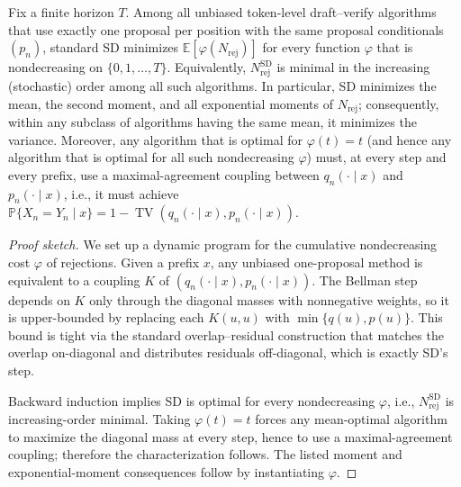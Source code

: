 \begin{theorem}\label{thm:sd-stepwise-coupling}\sloppy
Fix a finite horizon $T$. Among all unbiased token-level draft--verify algorithms that use exactly one proposal per position with the same proposal conditionals $(p_n)$, standard SD minimizes $\mathbb E[\varphi(N_{\mathrm{rej}})]$ for every function $\varphi$ that is nondecreasing on $\{0,1,\dots,T\}$. Equivalently, $N_{\mathrm{rej}}^{\mathrm{SD}}$ is minimal in the increasing (stochastic) order among all such algorithms. In particular, SD minimizes the mean, the second moment, and all exponential moments of $N_{\mathrm{rej}}$; consequently, within any subclass of algorithms having the same mean, it minimizes the variance. Moreover, any algorithm that is optimal for $\varphi(t)=t$ (and hence any algorithm that is optimal for all such nondecreasing $\varphi$) must, at every step and every prefix, use a maximal-agreement coupling between $q_n(\cdot\mid x)$ and $p_n(\cdot\mid x)$, i.e., it must achieve $\mathbb P\{X_n=Y_n\mid x\}=1-\operatorname{TV}(q_n(\cdot\mid x),p_n(\cdot\mid x))$.
\end{theorem}

\begin{proof}[Proof sketch]
We set up a dynamic program for the cumulative nondecreasing cost $\varphi$ of rejections. Given a prefix $x$, any unbiased one-proposal method is equivalent to a coupling $K$ of $(q_n(\cdot\mid x),p_n(\cdot\mid x))$. The Bellman step depends on $K$ only through the diagonal masses with nonnegative weights, so it is upper-bounded by replacing each $K(u,u)$ with $\min\{q(u),p(u)\}$. This bound is tight via the standard overlap–residual construction that matches the overlap on-diagonal and distributes residuals off-diagonal, which is exactly SD’s step.

Backward induction implies SD is optimal for every nondecreasing $\varphi$, i.e., $N_{\mathrm{rej}}^{\mathrm{SD}}$ is increasing-order minimal. Taking $\varphi(t)=t$ forces any mean-optimal algorithm to maximize the diagonal mass at every step, hence to use a maximal-agreement coupling; therefore the characterization follows. The listed moment and exponential-moment consequences follow by instantiating $\varphi$.\qedhere
\end{proof}

